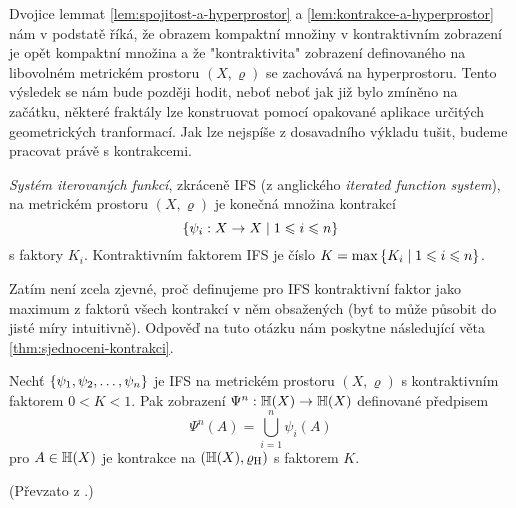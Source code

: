 Dvojice lemmat \ref{lem:spojitost-a-hyperprostor} a \ref{lem:kontrakce-a-hyperprostor} nám v podstatě říká, že obrazem kompaktní množiny v kontraktivním zobrazení je opět kompaktní množina a že "kontraktivita" zobrazení definovaného na libovolném metrickém prostoru $(X,\varrho)$ se zachovává na hyperprostoru. Tento výsledek se nám bude později hodit, neboť neboť jak již bylo zmíněno na začátku, některé fraktály lze konstruovat pomocí opakované aplikace určitých geometrických tranformací. Jak lze nejspíše z dosavadního výkladu tušit, budeme pracovat právě s kontrakcemi.
\begin{definition}\label{def:system-iterovanych-funkci}
    \emph{Systém iterovaných funkcí}, zkráceně IFS (z anglického \emph{iterated function system}), na metrickém prostoru $(X,\varrho)$ je konečná množina kontrakcí
    \[\left\{\psi_i:X \rightarrow X\mid 1\leqslant i\leqslant n\right\}\]
    s faktory $K_i$. Kontraktivním faktorem IFS je číslo $K=\max\left\{K_i\mid 1\leqslant i\leqslant n\right\}$.
\end{definition}
Zatím není zcela zjevné, proč definujeme pro IFS kontraktivní faktor jako maximum z faktorů všech kontrakcí v něm obsažených (byť to může působit do jisté míry intuitivně). Odpověď na tuto otázku nám poskytne následující věta \ref{thm:sjednoceni-kontrakci}.
\begin{theorem}\label{thm:sjednoceni-kontrakci}
    Nechť $\left\{\psi_1,\psi_2,\ldots,\psi_n\right\}$ je IFS na metrickém prostoru $(X,\varrho)$ s kontraktivním faktorem $0<K<1$. Pak zobrazení $\Psi^n:\mathbb{H}(X) \rightarrow \mathbb{H}(X)$ definované předpisem
    \[\Psi^n(A)=\bigcup_{i=1}^n\psi_i(A)\]
    pro $A\in\mathbb{H}(X)$ je kontrakce na $(\mathbb{H}(X),\varrho_\textup{H})$ s faktorem $K$.
\end{theorem}
(Převzato z \citep[str. 81]{Barnsley1993}.)
